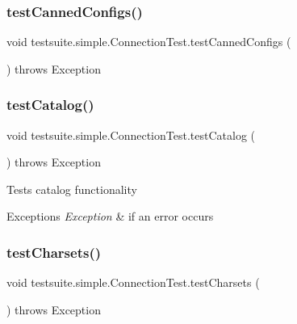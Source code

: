 \subsubsection{\texorpdfstring{test\+Canned\+Configs()}{testCannedConfigs()}}
{\footnotesize\ttfamily void testsuite.\+simple.\+Connection\+Test.\+test\+Canned\+Configs (\begin{DoxyParamCaption}{ }\end{DoxyParamCaption}) throws Exception}

\mbox{\label{classtestsuite_1_1simple_1_1_connection_test_a272c1a4280b551be2feb88f3995878b0}} 
\subsubsection{\texorpdfstring{test\+Catalog()}{testCatalog()}}
{\footnotesize\ttfamily void testsuite.\+simple.\+Connection\+Test.\+test\+Catalog (\begin{DoxyParamCaption}{ }\end{DoxyParamCaption}) throws Exception}

Tests catalog functionality


\begin{DoxyExceptions}{Exceptions}
{\em Exception} & if an error occurs \\
\hline
\end{DoxyExceptions}
\mbox{\label{classtestsuite_1_1simple_1_1_connection_test_a50e876f57ca8519b368cead6c0dbf840}} 
\subsubsection{\texorpdfstring{test\+Charsets()}{testCharsets()}}
{\footnotesize\ttfamily void testsuite.\+simple.\+Connection\+Test.\+test\+Charsets (\begin{DoxyParamCaption}{ }\end{DoxyParamCaption}) throws Exception}

